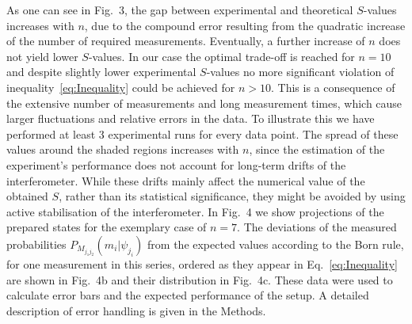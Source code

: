 \documentclass[aps,prl,floatfix,twocolumn,tightenlines,amsmath,amssymb,nofootinbib]{revtex4-1}
\begin{document}
As one can see in Fig.~3, the gap between experimental and theoretical $S$-values increases with $n$, due to the compound error resulting from the quadratic increase of the number of required measurements. Eventually, a further increase of $n$ does not yield lower $S$-values. In our case the optimal trade-off is reached for $n{=}10$ and despite slightly lower experimental $S$-values no more significant violation of inequality~\eqref{eq:Inequality} could be achieved for $n>10$. This is a consequence of the extensive number of measurements and long measurement times, which cause larger fluctuations and relative errors in the data. To illustrate this we have performed at least 3 experimental runs for every data point. The spread of these values around the shaded regions increases with $n$, since the estimation of the experiment's performance does not account for long-term drifts of the interferometer. While these drifts mainly affect the numerical value of the obtained $S$, rather than its statistical significance, they might be avoided by using active stabilisation of the interferometer.
In Fig.~4 we show projections of the prepared states for the exemplary case of $n{=}7$. The deviations of the measured probabilities $P_{M_{j_1j_2}}(m_i | \psi_{j_i})$ from the expected values according to the Born rule, for one measurement in this series, ordered as they appear in Eq.~\eqref{eq:Inequality} are shown in Fig.~4b and their distribution in Fig.~4c. These data were used to calculate error bars and the expected performance of the setup. A detailed description of error handling is given in the Methods.
\end{document}
